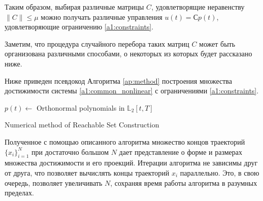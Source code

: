 \documentclass[../main.tex]{subfiles}
\begin{document}
  Таким образом, выбирая различные матрицы $C$, удовлетворящие неравенству $\| C\| \leqslant \mu $ можно получать различные управления $u(t) = С p(t)$, удовлетворяющие ограничению \eqref{a1:constraints}.
  
  Заметим, что процедура случайного перебора таких матриц $C$ может быть организована различными способами, о некоторых из которых будет рассказано ниже.
  
  Ниже приведен псевдокод Алгоритма \ref{ap:method} построения множества достижимости системы \eqref{a1:common_nonlinear} с ограничениями \eqref{a1:constraints}.
  \begin{algorithm}[hbt!]
  	$p(t) \gets $ Orthonormal polynomials in $\mathbb{L}_2[t,T]$ \;
  	\caption{Numerical method of Reachable Set Construction}
  	 \label{ap:method}
  \end{algorithm}
  
  Полученное с помощью описанного алгоритма множество концов траекторий $\{x_i\}_{i = 1}^{N}$ при достаточно большом $N$ дает представление о форме и размерах множества достижимости и его проекций. 
  Итерации алгоритма не зависимы друг от друга, что позволяет вычислять концы траекторий $x_i$ параллельно. 
  Это, в свою очередь, позволяет увеличивать $N$, сохраняя время работы алгоритма в разумных пределах.
  
\end{document}
